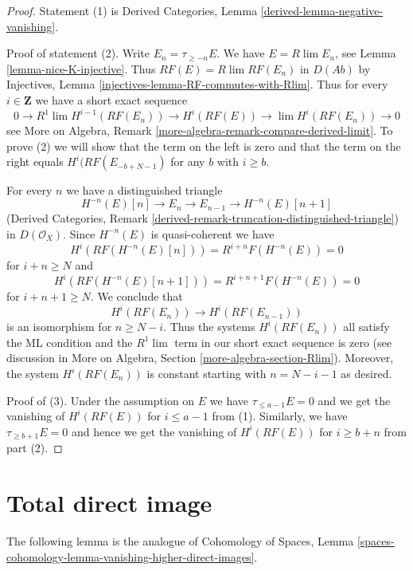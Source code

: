 \begin{proof}
Statement (1) is
Derived Categories, Lemma \ref{derived-lemma-negative-vanishing}.

\medskip\noindent
Proof of statement (2). Write $E_n = \tau_{\geq -n}E$. We have
$E = R\lim E_n$, see Lemma \ref{lemma-nice-K-injective}. Thus
$RF(E) = R\lim RF(E_n)$ in $D(\textit{Ab})$ by Injectives, Lemma
\ref{injectives-lemma-RF-commutes-with-Rlim}. Thus for every $i \in \mathbf{Z}$
we have a short exact sequence
$$
0 \to R^1\lim H^{i - 1}(RF(E_n)) \to H^i(RF(E)) \to \lim H^i(RF(E_n)) \to 0
$$
see More on Algebra, Remark
\ref{more-algebra-remark-compare-derived-limit}.
To prove (2) we will show that the term on the left is zero
and that the term on the right equals $H^i(RF(E_{-b + N - 1})$
for any $b$ with $i \geq b$.

\medskip\noindent
For every $n$ we have a distinguished triangle
$$
H^{-n}(E)[n] \to E_n \to E_{n - 1} \to H^{-n}(E)[n + 1]
$$
(Derived Categories, Remark
\ref{derived-remark-truncation-distinguished-triangle})
in $D(\mathcal{O}_X)$. Since $H^{-n}(E)$ is quasi-coherent we have
$$
H^i(RF(H^{-n}(E)[n])) = R^{i + n}F(H^{-n}(E)) = 0
$$
for $i + n \geq N$ and
$$
H^i(RF(H^{-n}(E)[n + 1])) = R^{i + n + 1}F(H^{-n}(E)) = 0
$$
for $i + n + 1 \geq N$. We conclude that
$$
H^i(RF(E_n)) \to H^i(RF(E_{n - 1}))
$$
is an isomorphism for $n \geq N - i$. Thus the systems $H^i(RF(E_n))$ all
satisfy the ML condition and the $R^1\lim$ term in our short exact
sequence is zero (see discussion in
More on Algebra, Section \ref{more-algebra-section-Rlim}).
Moreover, the system $H^i(RF(E_n))$ is constant starting
with $n = N - i - 1$ as desired.

\medskip\noindent
Proof of (3). Under the assumption on $E$ we have
$\tau_{\leq a - 1}E = 0$ and we get the vanishing
of $H^i(RF(E))$ for $i \leq a - 1$ from (1).
Similarly, we have $\tau_{\geq b + 1}E = 0$ and hence
we get the vanishing of $H^i(RF(E))$ for $i \geq b + n$ from
part (2).
\end{proof}









\section{Total direct image}
\label{section-total-direct-image}

\noindent
The following lemma is the analogue of
Cohomology of Spaces, Lemma
\ref{spaces-cohomology-lemma-vanishing-higher-direct-images}.

